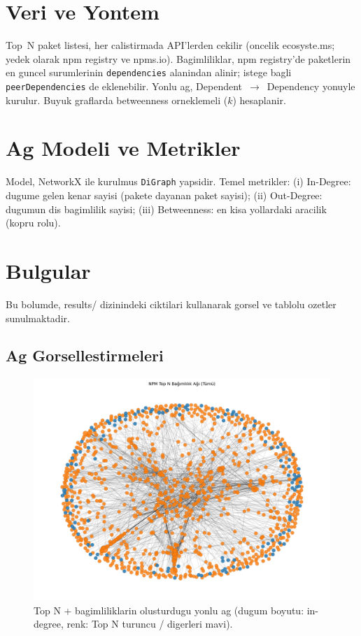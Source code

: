 \documentclass[11pt,a4paper]{article}
\begin{document}
\section{Veri ve Yontem}
Top~N paket listesi, her calistirmada API'lerden cekilir (oncelik ecosyste.ms; yedek olarak npm registry ve npms.io). Bagimliliklar, npm registry'de paketlerin en guncel surumlerinin \texttt{dependencies} alanindan alinir; istege bagli \texttt{peerDependencies} de eklenebilir. Yonlu ag, Dependent~$\to$~Dependency yonuyle kurulur. Buyuk graflarda betweenness orneklemeli ($k$) hesaplanir.

\section{Ag Modeli ve Metrikler}
Model, NetworkX ile kurulmus \texttt{DiGraph} yapsidir. Temel metrikler: (i) In-Degree: dugume gelen kenar sayisi (pakete dayanan paket sayisi); (ii) Out-Degree: dugumun dis bagimlilik sayisi; (iii) Betweenness: en kisa yollardaki aracilik (kopru rolu).

\section{Bulgular}
Bu bolumde, results/ dizinindeki ciktilari kullanarak gorsel ve tablolu ozetler sunulmaktadir.

\subsection{Ag Gorsellestirmeleri}
\begin{figure}[h]
  \centering
  \includegraphics[width=0.90\linewidth]{network_full_topN.png}
  \caption{Top N + bagimliliklarin olusturdugu yonlu ag (dugum boyutu: in-degree, renk: Top N turuncu / digerleri mavi).}
\end{figure}
\end{document}
